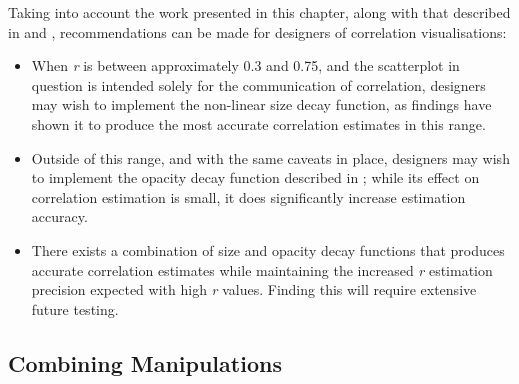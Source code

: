 \documentclass[../main.tex]{subfiles}
\begin{document}
Taking into account the work presented in this chapter, along with that
described in  and
, recommendations can be made for designers of
correlation visualisations:

\begin{itemize}
\tightlist
\item
  When \emph{r} is between approximately 0.3 and 0.75, and the
  scatterplot in question is intended solely for the communication of
  correlation, designers may wish to implement the non-linear size decay
  function, as findings have shown it to produce the most accurate
  correlation estimates in this range.
\item
  Outside of this range, and with the same caveats in place, designers
  may wish to implement the opacity decay function described in
  ; while its effect on correlation
  estimation is small, it does significantly increase estimation
  accuracy.
\item
  There exists a combination of size and opacity decay functions that
  produces accurate correlation estimates while maintaining the
  increased \emph{r} estimation precision expected with high \emph{r}
  values. Finding this will require extensive future testing.
\end{itemize}

\subsection{Combining Manipulations}\label{combining-manipulations}
\end{document}
